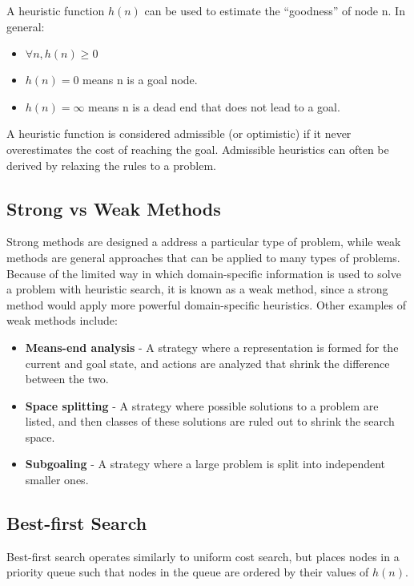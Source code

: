 \documentclass[12pt,titlepage]{article}
\begin{document}
      A heuristic function $h(n)$ can be used to estimate the ``goodness'' of node n. In general:
      \begin{itemize}
        \item $\forall n, h(n) \geq 0$
        \item $h(n) = 0$ means n is a goal node.
        \item $h(n) = \infty$ means n is a dead end that does not lead to a goal.
      \end{itemize}

      A heuristic function is considered admissible (or optimistic) if it never overestimates the cost of reaching the goal.
      Admissible heuristics can often be derived by relaxing the rules to a problem.

    \subsection{Strong vs Weak Methods}
      Strong methods are designed a address a particular type of problem, while weak methods are general approaches that can be applied
      to many types of problems. Because of the limited way in which domain-specific information is used to solve a problem with heuristic
      search, it is known as a weak method, since a strong method would apply more powerful domain-specific heuristics. Other examples of
      weak methods include:
      \begin{itemize}
        \item \textbf{Means-end analysis} - A strategy where a representation is formed for the current and goal state, and actions are
        analyzed that shrink the difference between the two.
        \item \textbf{Space splitting} - A strategy where possible solutions to a problem are listed, and then classes of these solutions
        are ruled out to shrink the search space.
        \item \textbf{Subgoaling} - A strategy where a large problem is split into independent smaller ones.
      \end{itemize}

    \subsection{Best-first Search}
      Best-first search operates similarly to uniform cost search, but places nodes in a priority queue such that nodes in the queue are
      ordered by their values of $h(n)$.
\end{document}

